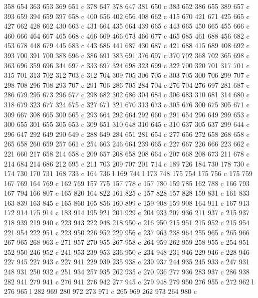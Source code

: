 {{   358 654 363 653 369 651 c
   378 647 378 647 381 650 c
   383 652 386 655 389 657 c
   393 659 394 659 397 658 c
   400 656 402 656 408 662 c
   415 670 421 671 425 665 c
   427 662 428 662 430 663 c
   431 664 435 664 439 665 c
   443 665 450 665 455 666 c
   460 666 464 667 465 668 c
   466 669 466 673 466 677 c
   465 685 461 688 456 682 c
   453 678 448 679 445 683 c
   443 686 441 687 430 687 c
   421 688 415 689 408 692 c
   393 700 391 700 388 696 c
   386 691 383 691 376 697 c
   370 702 368 702 365 698 c
   363 696 359 696 344 697 c
   333 697 324 698 323 699 c
   322 700 320 701 317 701 c
   315 701 313 702 312 703 c
   312 704 309 705 306 705 c
   303 705 300 706 299 707 c
   298 708 296 708 293 707 c
   291 706 286 705 284 704 c
   276 704 276 697 281 687 c
   286 679 295 673 296 677 c
   298 682 302 686 304 684 c
   306 683 310 681 314 680 c
   318 679 323 677 324 675 c
   327 671 321 670 313 673 c
   305 676 300 675 305 671 c
   309 667 308 665 300 665 c
   293 664 292 664 292 660 c
   291 654 296 649 299 653 c
   300 655 301 655 305 653 c
   309 651 310 648 310 645 c
   310 637 305 637 299 644 c
   296 647 292 649 290 649 c
   288 649 284 651 281 654 c
   277 656 272 658 268 658 c
   265 658 260 659 257 661 c
   254 663 246 664 239 665 c
   227 667 226 666 223 662 c
   221 660 217 658 214 658 c
   209 657 208 658 208 664 c
   207 668 208 673 211 678 c
   214 684 214 686 212 695 c
   211 703 209 707 201 714 c
   189 726 184 730 178 730 c
   174 730 170 731 168 733 c
   164 736 l
   169 744 l
   173 748 175 754 175 756 c
   175 759 167 769 164 769 c
   162 769 157 775 157 778 c
   157 780 159 785 162 788 c
   166 793 167 794 166 807 c
   165 820 164 822 161 825 c
   157 828 157 828 159 831 c
   161 833 163 839 163 845 c
   165 860 165 856 160 899 c
   159 908 159 908 164 911 c
   167 913 172 914 175 914 c
   183 914 195 921 201 929 c
   204 933 207 936 211 937 c
   215 937 218 939 219 940 c
   223 943 222 948 218 950 c
   216 950 215 951 215 952 c
   215 954 221 954 222 951 c
   223 950 226 952 229 956 c
   237 963 238 964 255 965 c
   265 966 267 965 268 963 c
   271 957 270 955 267 958 c
   264 959 262 959 258 955 c
   254 951 252 950 246 952 c
   241 953 239 953 236 950 c
   234 948 231 946 229 946 c
   228 946 227 945 227 943 c
   227 941 229 939 235 938 c
   239 937 244 935 245 933 c
   247 931 248 931 250 932 c
   251 934 257 935 262 935 c
   270 936 277 936 283 937 c
   286 938 282 941 279 941 c
   276 941 276 942 277 945 c
   279 948 279 950 276 955 c
   272 962 l
   276 965 l
   282 969 280 972 273 971 c
   265 969 262 973 264 980 c
}}
